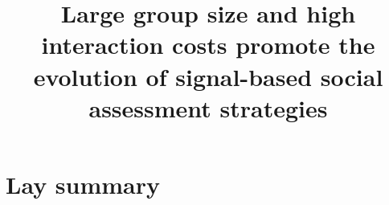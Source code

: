 




\noindent
\title{Large group size and high interaction costs promote the evolution of signal-based social assessment strategies} 
\author{}
\date{} 
\maketitle


\linenumbers

\section*{Lay summary}




